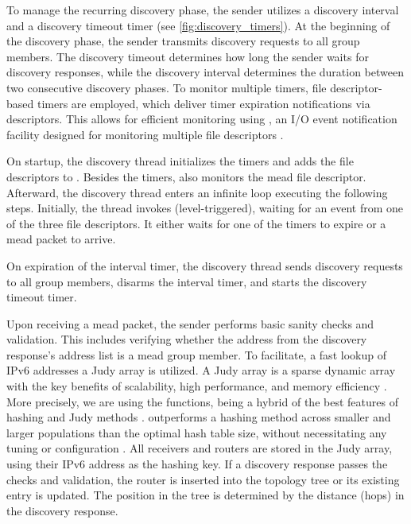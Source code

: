 To manage the recurring discovery phase, the sender utilizes a discovery
    interval and a discovery timeout timer (see
    \autoref{fig:discovery_timers}).
At the beginning of the discovery phase, the sender transmits discovery
    requests to all group members.
The discovery timeout determines how long the sender waits for discovery
    responses, while the discovery interval determines the duration between two
    consecutive discovery phases.
To monitor multiple timers, file descriptor-based timers are employed, which
    deliver timer expiration notifications via descriptors.
This allows for efficient monitoring using 
    \cite{man_timerfd}, an I/O event notification facility designed for
    monitoring multiple file descriptors \cite{man_epoll}.

On startup, the discovery thread initializes the timers and adds the file
    descriptors to .
Besides the timers,  also monitors the \gls{mead} file
    descriptor.
Afterward, the discovery thread enters an infinite loop executing the following
    steps.
Initially, the thread invokes  (level-triggered), waiting
    for an event from one of the three file descriptors.
It either waits for one of the timers to expire or a \gls{mead} packet to arrive.

On expiration of the interval timer, the discovery thread sends discovery
    requests to all group members, disarms the interval timer, and starts the
    discovery timeout timer.

Upon receiving a \gls{mead} packet, the sender performs basic sanity checks and
    validation.
This includes verifying whether the address from the discovery response's
    address list is a \gls{mead} group member.
To facilitate, a fast lookup of IPv6 addresses a Judy array is utilized.
A Judy array is a sparse dynamic array with the key benefits of scalability,
    high performance, and memory efficiency \cite{web_judy}.
More precisely, we are using the  functions, being a
    hybrid of the best features of hashing  and  Judy  methods \cite{man_judy}.
 outperforms a hashing method across smaller and larger
    populations than the optimal hash table size, without necessitating any
    tuning or configuration \cite{man_judy}.
All receivers and routers are stored in the Judy array, using their IPv6
    address as the hashing key.
If a discovery response passes the checks and validation, the router
    is inserted into the topology tree or its existing entry is updated.
The position in the tree is determined by the distance (hops) in the discovery 
    response.

